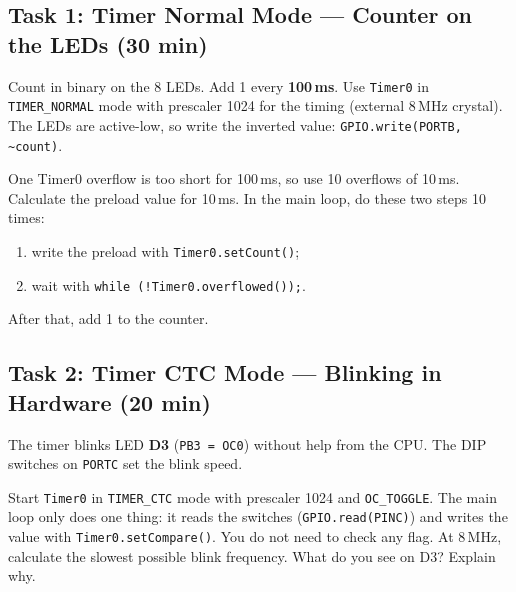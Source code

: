 \documentclass[11pt,a4paper]{article}
\newcommand{\code}[1]{\texttt{#1}}
\begin{document}
\subsection*{Task 1: Timer Normal Mode --- Counter on the LEDs (30 min)}
Count in binary on the 8 LEDs. Add 1 every \textbf{100\,ms}. Use \code{Timer0}
in \code{TIMER\_NORMAL} mode with prescaler 1024 for the timing (external
8\,MHz crystal). The LEDs are active-low, so write the inverted value: \code{GPIO.write(PORTB, \textasciitilde count)}.

One Timer0 overflow is too short for 100\,ms, so use 10 overflows of 10\,ms.
Calculate the preload value for 10\,ms. In the main loop, do these two steps
10 times:
\begin{enumerate}
  \item write the preload with \code{Timer0.setCount()};
  \item wait with \code{while (!Timer0.overflowed());}.
\end{enumerate}
After that, add 1 to the counter.

\subsection*{Task 2: Timer CTC Mode --- Blinking in Hardware (20 min)}
The timer blinks LED \textbf{D3} (\code{PB3 = OC0}) without help from the CPU.
The DIP switches on \code{PORTC} set the blink speed.

Start \code{Timer0} in \code{TIMER\_CTC} mode with prescaler 1024 and
\code{OC\_TOGGLE}. The main loop only does one thing: it reads the switches
(\code{GPIO.read(PINC)}) and writes the value with \code{Timer0.setCompare()}.
You do not need to check any flag. At 8\,MHz, calculate the slowest possible
blink frequency. What do you see on D3? Explain why.
\end{document}
